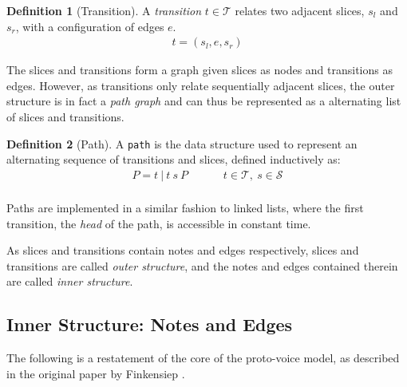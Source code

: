 \documentclass[12pt,a4paper,twoside,openany]{report} \usepackage[pdfborder={0 0 0}]{hyperref}    %
\theoremstyle{definition} \newtheorem{definition}{Definition}[section]
\begin{document}
\begin{definition}[Transition] 
  A \textit{transition} $t \in \mathcal{T}$ relates two adjacent slices, $s_l$ and $s_r$,
  with a configuration of edges $e$. 
  \begin{equation} 
    \begin{aligned} 
      t = (s_l, e, s_r)
    \end{aligned} 
    \label{eq:transition} 
  \end{equation} 
\end{definition}

  The slices and transitions form a graph given slices as nodes and transitions as edges.
  However, as transitions only relate sequentially adjacent slices, the outer structure is in fact a \textit{path graph}
  and can thus be represented as a alternating list of slices and transitions.

  \begin{definition}[Path] A \texttt{path} is the data structure used to represent an alternating sequence of
    transitions and slices, defined inductively as:
      \begin{equation} 
        \begin{aligned} 
          P = t~|~t~s~P  &&&& t \in \mathcal{T},~s \in \mathcal{S}\\ 
        \end{aligned}
      \label{eq:pathGraph} 
      \end{equation} 
      \label{def:pathGraph} 
    \end{definition}

  Paths are implemented in a similar fashion to linked lists, where the first transition, the \textit{head} of the
  path, is accessible in constant time.

  As slices and transitions contain notes and edges respectively, slices and transitions are called \textit{outer
  structure}, and the notes and edges contained therein are called \textit{inner structure}.

\subsection{Inner Structure: Notes and Edges} 
\label{sub:Inner Structure}
The following is a restatement of the core of the proto-voice model,  as described in the original paper by Finkensiep \cite{finkensiepModelingInferringProtovoice2021}.
\end{document}
